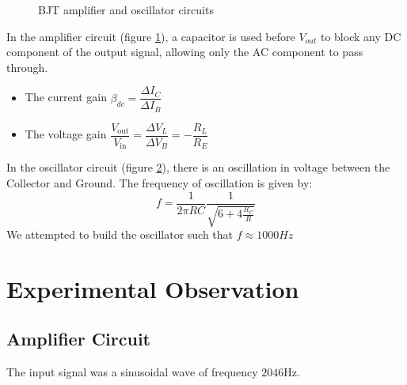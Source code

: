 \documentclass[../main.tex]{subfiles}
\begin{document}
%	
%	
\begin{figure}[H]
	\centering
	\begin{subfigure}{0.4\textwidth}
		\centering
		
		\label{fig:amplifier}
	\end{subfigure}
	\hfill
	\begin{subfigure}{0.4\textwidth}
		\centering
		
		\label{fig:oscillator}
	\end{subfigure}
	\caption{BJT amplifier and oscillator circuits}
	\label{fig:amp_osc}
\end{figure}
\noindent In the amplifier circuit (figure \ref{fig:amplifier}), a capacitor is used before \(V_{out}\) to block any DC component of the output signal, allowing only the AC component to pass through.
\begin{itemize}
	\item The current gain \(\beta_{dc} = \dfrac{\Delta I_C}{\Delta I_B}\)
	\item The voltage gain \(\dfrac{V_{\textrm{out}}}{V_{\textrm{in}}} = \dfrac{\Delta V_L}{\Delta V_B} = - \dfrac{R_L}{R_E}\)
\end{itemize}

\noindent In the oscillator circuit (figure \ref{fig:oscillator}), there is an oscillation in voltage between the Collector and Ground.
The frequency of oscillation is given by:
\[f = \frac{1}{2\pi RC} \frac{1}{\sqrt{6 + 4\tfrac{R_C}{R}}}\]
We attempted to build the oscillator such that \(f \approx 1000Hz\)

\section{Experimental Observation}


\subsection*{Amplifier Circuit}
The input signal was a sinusoidal wave of frequency \(2046 \textrm{Hz}\).
\begin{table}[H]
	\centering
	
	\caption{Observations for the BJT amplifier circuit}
\end{table}
\end{document}
